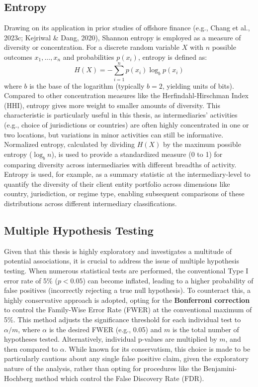 \subsection{Entropy}
\label{subsec:entropy}
Drawing on its application in prior studies of offshore finance (e.g., Chang et al., 2023c; Kejriwal \& Dang, 2020), Shannon entropy is employed as a measure of diversity or concentration. For a discrete random variable $X$ with $n$ possible outcomes $x_1, ..., x_n$ and probabilities $p(x_i)$, entropy is defined as:
\begin{equation}
    H(X) = -\sum_{i=1}^{n} p(x_i) \log_b p(x_i)
\end{equation}
where $b$ is the base of the logarithm (typically $b=2$, yielding units of bits). Compared to other concentration measures like the Herfindahl-Hirschman Index (HHI), entropy gives more weight to smaller amounts of diversity. This characteristic is particularly useful in this thesis, as intermediaries' activities (e.g., choice of jurisdictions or countries) are often highly concentrated in one or two locations, but variations in minor activities can still be informative. Normalized entropy, calculated by dividing $H(X)$ by the maximum possible entropy ($\log_b n$), is used to provide a standardized measure (0 to 1) for comparing diversity across intermediaries with different breadths of activity. Entropy is used, for example, as a summary statistic at the intermediary-level to quantify the diversity of their client entity portfolio across dimensions like country, jurisdiction, or regime type, enabling subsequent comparisons of these distributions across different intermediary classifications.

\subsection{Multiple Hypothesis Testing}
\label{subsec:multiple_hypothesis_testing}
Given that this thesis is highly exploratory and investigates a multitude of potential associations, it is crucial to address the issue of multiple hypothesis testing. When numerous statistical tests are performed, the conventional Type I error rate of 5\% ($p < 0.05$) can become inflated, leading to a higher probability of false positives (incorrectly rejecting a true null hypothesis). To counteract this, a highly conservative approach is adopted, opting for the \textbf{Bonferroni correction} to control the Family-Wise Error Rate (FWER) at the conventional maximum of 5\%. This method adjusts the significance threshold for each individual test to $\alpha/m$, where $\alpha$ is the desired FWER (e.g., 0.05) and $m$ is the total number of hypotheses tested. Alternatively, individual p-values are multiplied by $m$, and then compared to $\alpha$. While known for its conservatism, this choice is made to be particularly cautious about any single false positive claim, given the exploratory nature of the analysis, rather than opting for procedures like the Benjamini-Hochberg method which control the False Discovery Rate (FDR).

